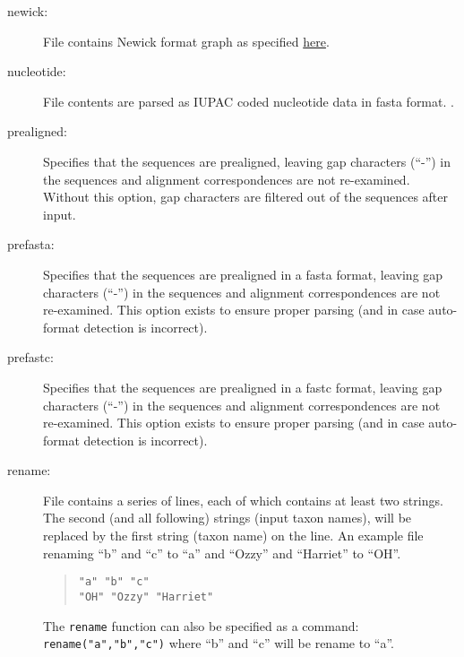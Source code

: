 \begin{description}
		\item [newick:] File contains Newick format graph as specified 
		\href{https://evolution.genetics.washington.edu/phylip/newick_doc.html}{here}.
			
		\item [nucleotide:] File contents are parsed as IUPAC coded nucleotide data in fasta 
			\citep{PearsonandLipman1988} format. .
			
		\item [prealigned:] Specifies that the sequences are prealigned, leaving gap characters
			(``-'') in the sequences and alignment correspondences are not re-examined. Without this option,
			gap characters are filtered out of the sequences after input.
			
		\item [prefasta:] Specifies that the sequences are prealigned in a fasta format, leaving gap characters
			(``-'') in the sequences and alignment correspondences are not re-examined. This option exists to 
			ensure proper parsing (and in case auto-format detection is incorrect).
			
		\item [prefastc:] Specifies that the sequences are prealigned in a fastc format, leaving gap characters
			(``-'') in the sequences and alignment correspondences are not re-examined. This option exists 
			to ensure proper parsing (and in case auto-format detection is incorrect).
			
		\item [rename:] File contains a series of lines, each of which contains at least two strings. The second 
		(and all following) strings (input taxon names),
			will be replaced by the first string (taxon name) on the line. An example file renaming ``b'' and ``c'' 
			to ``a'' and ``Ozzy'' and ``Harriet'' to ``OH''.
				\begin{quote}
					\texttt{"a" "b" "c"}\\
					\texttt{"OH" "Ozzy" "Harriet"}
				\end{quote}
		
		The \texttt{rename} function can also be specified as a command: \texttt{rename("a","b","c")} where 
		``b'' and ``c'' will be rename to ``a''. 
			 

\end{description}
